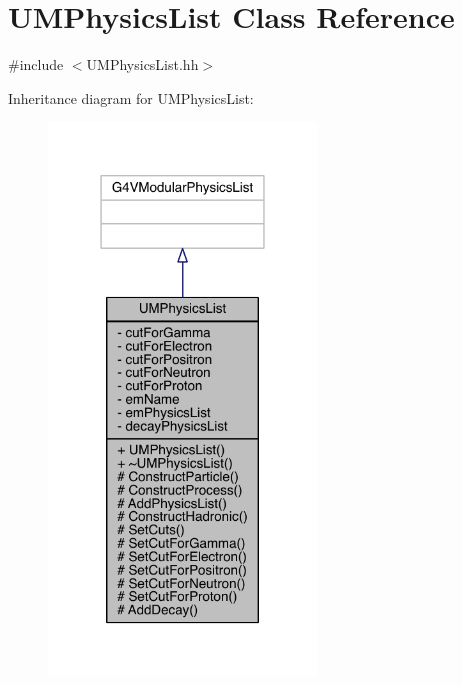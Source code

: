 \hypertarget{classUMPhysicsList}{}\section{U\+M\+Physics\+List Class Reference}
\label{classUMPhysicsList}


{\ttfamily \#include $<$U\+M\+Physics\+List.\+hh$>$}



Inheritance diagram for U\+M\+Physics\+List\+:
\nopagebreak
\begin{figure}[H]
\begin{center}
\leavevmode
\includegraphics[width=202pt]{classUMPhysicsList__inherit__graph}
\end{center}
\end{figure}


